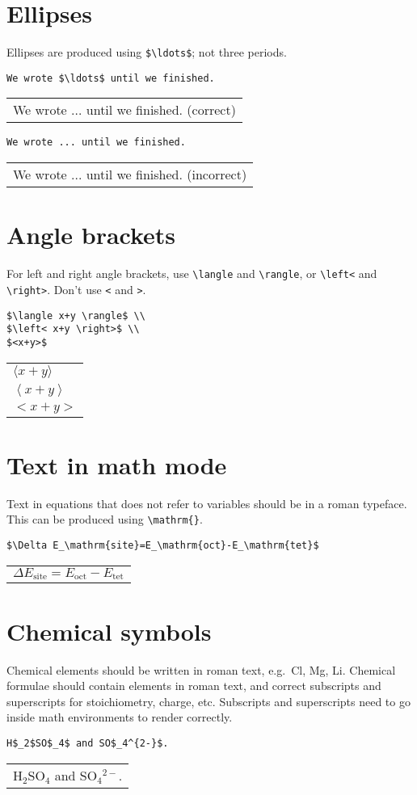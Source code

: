 \documentclass[a4paper]{tufte-handout}
\begin{document}
\section{Ellipses} 
Ellipses are produced using \lstinline|$\ldots$|; not three periods.
\begin{lstlisting}
We wrote $\ldots$ until we finished. 
\end{lstlisting}
\begin{tabular}{|p{10cm}}
We wrote $\ldots$ until we finished. (correct)
\end{tabular}

\begin{lstlisting}
We wrote ... until we finished.
\end{lstlisting}
\begin{tabular}{|p{10cm}}
We wrote ... until we finished. (incorrect)
\end{tabular}


\section{Angle brackets} 
For left and right angle brackets, use \lstinline{\langle} and \lstinline{\rangle}, or \lstinline$\left<$ and \lstinline$\right>$. Don't use \lstinline{<} and \lstinline{>}.
\begin{lstlisting}
$\langle x+y \rangle$ \\
$\left< x+y \right>$ \\
$<x+y>$
\end{lstlisting}
\begin{tabular}{|p{10cm}}
$\langle x+y \rangle$ \\
$\left< x+y \right>$ \\
$<x+y>$
\end{tabular}

\section{Text in math mode}
Text in equations that does not refer to variables should be in a roman typeface. This can be produced using \lstinline$\mathrm{}$.
\begin{lstlisting}
$\Delta E_\mathrm{site}=E_\mathrm{oct}-E_\mathrm{tet}$
\end{lstlisting}
\begin{tabular}{|p{10cm}}
$\Delta E_\mathrm{site}=E_\mathrm{oct}-E_\mathrm{tet}$
\end{tabular}

\section{Chemical symbols}
Chemical elements should be written in roman text, e.g.\ Cl, Mg, Li.
Chemical formulae should contain elements in roman text, and correct subscripts and superscripts for stoichiometry, charge, etc. Subscripts and superscripts need to go inside math environments to render correctly.
\begin{lstlisting}
H$_2$SO$_4$ and SO$_4^{2-}$.
\end{lstlisting}
\begin{tabular}{|p{10cm}}
H$_2$SO$_4$ and SO$_4$$^{2-}$.
\end{tabular}
\end{document}
